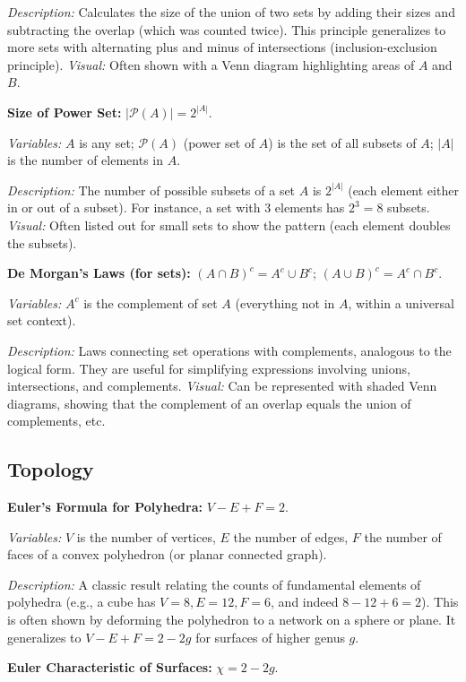 \documentclass{article}
\begin{document}
\textit{Description:} Calculates the size of the union of two sets by adding their sizes and subtracting the overlap (which was counted twice). This principle generalizes to more sets with alternating plus and minus of intersections (inclusion-exclusion principle). \textit{Visual:} Often shown with a Venn diagram highlighting areas of $A$ and $B$.

\textbf{Size of Power Set:} $| \mathcal{P}(A) | = 2^{|A|}$.

\textit{Variables:} $A$ is any set; $\mathcal{P}(A)$ (power set of $A$) is the set of all subsets of $A$; $|A|$ is the number of elements in $A$.

\textit{Description:} The number of possible subsets of a set $A$ is $2^{|A|}$ (each element either in or out of a subset). For instance, a set with 3 elements has $2^3=8$ subsets. \textit{Visual:} Often listed out for small sets to show the pattern (each element doubles the subsets).

\textbf{De Morgan’s Laws (for sets):} $(A \cap B)^c = A^c \cup B^c$;  $(A \cup B)^c = A^c \cap B^c$.

\textit{Variables:} $A^c$ is the complement of set $A$ (everything not in $A$, within a universal set context).

\textit{Description:} Laws connecting set operations with complements, analogous to the logical form. They are useful for simplifying expressions involving unions, intersections, and complements. \textit{Visual:} Can be represented with shaded Venn diagrams, showing that the complement of an overlap equals the union of complements, etc.

\subsection*{Topology}

\textbf{Euler’s Formula for Polyhedra:} $V - E + F = 2$.

\textit{Variables:} $V$ is the number of vertices, $E$ the number of edges, $F$ the number of faces of a convex polyhedron (or planar connected graph).

\textit{Description:} A classic result relating the counts of fundamental elements of polyhedra (e.g., a cube has $V=8, E=12, F=6$, and indeed $8-12+6=2$). This is often shown by deforming the polyhedron to a network on a sphere or plane. It generalizes to $V-E+F=2-2g$ for surfaces of higher genus $g$.

\textbf{Euler Characteristic of Surfaces:} $\chi = 2 - 2g$.
\end{document}
